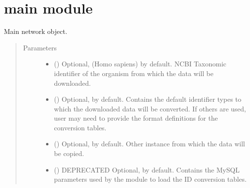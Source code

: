 \documentclass[letterpaper,10pt,english]{sphinxmanual}
\begin{document}
\section{main module}
\label{\detokenize{reference:module-pypath.main}}\label{\detokenize{reference:main-module}}

\begin{fulllineitems}
\label{\detokenize{reference:pypath.main.PyPath}}
Main network object.
\begin{quote}\begin{description}
\item[{Parameters}] \leavevmode\begin{itemize}
\item {} 
 () \textendash{} Optional,  (Homo sapiens) by default. NCBI Taxonomic
identifier of the organism from which the data will be
downloaded.

\item {} 
 () \textendash{} Optional,  by default. Contains
the default identifier types to which the downloaded data will
be converted. If others are used, user may need to provide the
format definitions for the conversion tables.

\item {} 
 ({\hyperref[\detokenize{reference:pypath.main.PyPath}]{}}) \textendash{} Optional,  by default. Other
{\hyperref[\detokenize{reference:pypath.main.PyPath}]{}} instance from which the data will
be copied.

\item {} 
 () \textendash{} DEPRECATED Optional,  by default. Contains the MySQL
parameters used by the  module to load
the ID conversion tables.


\end{itemize}
\end{description}
\end{quote}
\end{fulllineitems}
\end{document}
